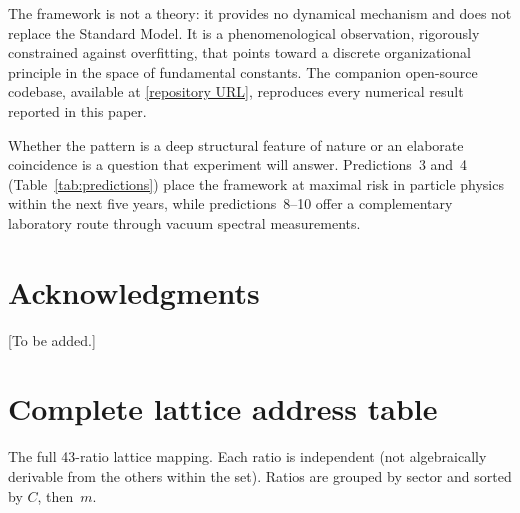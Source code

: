 \documentclass[12pt,a4paper]{article}
\begin{document}
The framework is not a theory: it provides no dynamical mechanism and does not
replace the Standard Model.  It is a phenomenological observation, rigorously
constrained against overfitting, that points toward a discrete organizational
principle in the space of fundamental constants.  The companion open-source
codebase, available at \url{[repository URL]}, reproduces every numerical
result reported in this paper.

Whether the pattern is a deep structural feature of nature or an elaborate
coincidence is a question that experiment will answer.  Predictions~3 and~4
(Table~\ref{tab:predictions}) place the framework at maximal risk in
particle physics within the next five years, while predictions~8--10 offer
a complementary laboratory route through vacuum spectral measurements.


\section*{Acknowledgments}

[To be added.]


\appendix

\section{Complete lattice address table}
\label{app:address_table}

The full 43-ratio lattice mapping.  Each ratio is independent (not
algebraically derivable from the others within the set).  Ratios are grouped
by sector and sorted by $C$, then~$m$.
\end{document}

